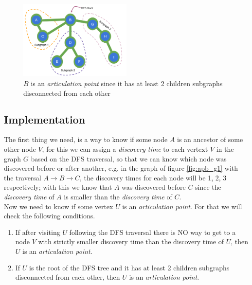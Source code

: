 \documentclass[twoside, openany]{book}
\begin{document}
\begin{figure}[H]
  \centering
  \includegraphics[width=0.5\textwidth]{"Images/Graph Theory/Articulation Points And Bridges/g6.pdf"}
  \caption{$B$ is an \textit{articulation point} since it has at least 2 children subgraphs disconnected from each other}
  \label{fig:apb_g6}
\end{figure}

\subsection*{Implementation}

The first thing we need, is a way to know if some node $A$ is an ancestor of some other node $V$, for this
we can assign a \textit{discovery time} to each vertext $V$ in the graph $G$ based on the DFS traversal,
so that we can know which node was discovered before or after another, e.g. in the graph of figure \ref{fig:apb_g1} with the traversal
$A \rightarrow B \rightarrow C$, the discovery times for each node will be 1, 2, 3 respectively; with this we know that
$A$ was discovered before $C$ since the \textit{discovery time} of $A$ is smaller than the \textit{discovery time} of $C$.\\

\noindent
Now we need to know if some vertex $U$ is an \textit{articulation point}. For that we will check the following conditions.

\begin{enumerate}
  \item If after visiting $U$ following the DFS traversal there is NO way to get to a node $V$ with strictly smaller discovery time
        than the discovery time of $U$, then $U$ is an \textit{articulation point}.
  \item If $U$ is the root of the DFS tree and it has at least 2 children subgraphs disconnected from each other, then $U$ is an
        \textit{articulation point}.
\end{enumerate}
\begin{multicols*}{2}
\end{multicols*}
\end{document}
